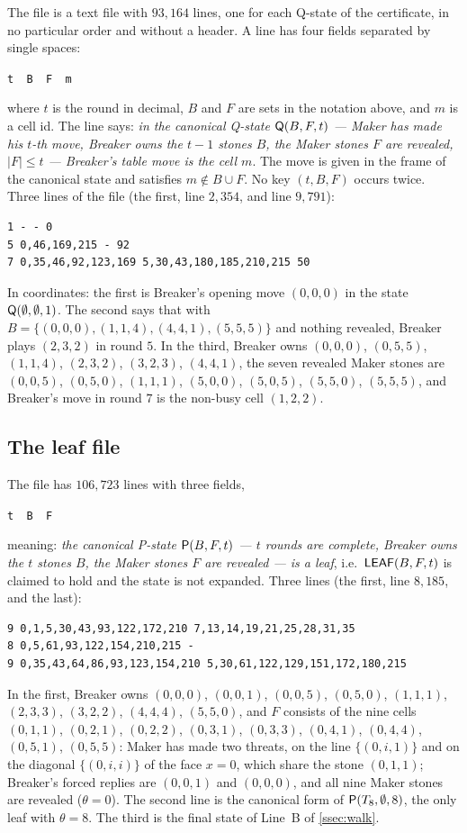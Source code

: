 The file  is a text file with $93{,}164$ lines, one for each Q-state of the
certificate, in no particular order and without a header. A line has four fields separated by single
spaces:
\begin{center}
\texttt{t\ \ B\ \ F\ \ m}
\end{center}
where $t$ is the round in decimal, $B$ and $F$ are sets in the notation above, and $m$ is a cell id. The
line says: \emph{in the canonical Q-state $\mathsf{Q}(B,F,t)$ --- Maker has made his $t$-th move, Breaker owns the
$t-1$ stones $B$, the Maker stones $F$ are revealed, $|F|\le t$ --- Breaker's table move is the cell $m$}.
The move is given in the frame of the canonical state and satisfies $m\notin B\cup F$. No key $(t,B,F)$
occurs twice. Three lines of the file (the first, line $2{,}354$, and line $9{,}791$):
\begin{verbatim}
1 - - 0
5 0,46,169,215 - 92
7 0,35,46,92,123,169 5,30,43,180,185,210,215 50
\end{verbatim}
In coordinates: the first is Breaker's opening move $(0,0,0)$ in the state $\mathsf{Q}(\emptyset,\emptyset,1)$.
The second says that with $B=\{(0,0,0),(1,1,4),(4,4,1),(5,5,5)\}$ and nothing revealed, Breaker plays
$(2,3,2)$ in round $5$. In the third, Breaker owns $(0,0,0)$, $(0,5,5)$, $(1,1,4)$, $(2,3,2)$, $(3,2,3)$,
$(4,4,1)$, the seven revealed Maker stones are $(0,0,5)$, $(0,5,0)$, $(1,1,1)$, $(5,0,0)$, $(5,0,5)$,
$(5,5,0)$, $(5,5,5)$, and Breaker's move in round $7$ is the non-busy cell $(1,2,2)$.

\subsection{The leaf file}\label{ssec:fmt-leaves}

The file  has $106{,}723$ lines with three fields,
\begin{center}
\texttt{t\ \ B\ \ F}
\end{center}
meaning: \emph{the canonical P-state $\mathsf{P}(B,F,t)$ --- $t$ rounds are complete, Breaker owns the $t$ stones
$B$, the Maker stones $F$ are revealed --- is a leaf}, i.e.\ $\mathsf{LEAF}(B,F,t)$ is claimed to hold and the
state is not expanded. Three lines (the first, line $8{,}185$, and the last):
\begin{verbatim}
9 0,1,5,30,43,93,122,172,210 7,13,14,19,21,25,28,31,35
8 0,5,61,93,122,154,210,215 -
9 0,35,43,64,86,93,123,154,210 5,30,61,122,129,151,172,180,215
\end{verbatim}
In the first, Breaker owns $(0,0,0)$, $(0,0,1)$, $(0,0,5)$, $(0,5,0)$, $(1,1,1)$, $(2,3,3)$, $(3,2,2)$,
$(4,4,4)$, $(5,5,0)$, and $F$ consists of the nine cells $(0,1,1)$, $(0,2,1)$, $(0,2,2)$, $(0,3,1)$,
$(0,3,3)$, $(0,4,1)$, $(0,4,4)$, $(0,5,1)$, $(0,5,5)$: Maker has made two threats, on the line $\{(0,i,1)\}$ and on the diagonal
$\{(0,i,i)\}$ of the face $x=0$, which share the stone $(0,1,1)$; Breaker's forced replies are $(0,0,1)$ and
$(0,0,0)$, and all nine Maker stones are revealed ($\theta=0$). The second line is the canonical form of
$\mathsf{P}(T_8,\emptyset,8)$, the only leaf with $\theta=8$. The third is the final state of Line~B of
\cref{ssec:walk}.

